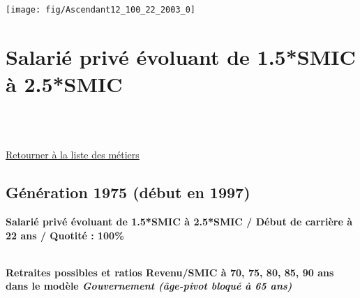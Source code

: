  \vspace{0.1cm} 

 {\hspace{-2.2cm}\texttt{[image: fig/Ascendant12\_100\_22\_2003\_0]}} 

\newpage 
 
\chapter{Salarié privé évoluant de 1.5*SMIC à 2.5*SMIC} 

~\\ 
 


   
 \localtableofcontents 

~\\ 
 
 \hyperlink{page.2}{\noindent Retourner à la liste des métiers}

 \newpage 

\section{Génération 1975 (début en 1997)\label{Ascendant1525_100_22_1975_0}} 
 
{\bf \noindent Salarié privé évoluant de 1.5*SMIC à 2.5*SMIC / Début de carrière à 22 ans / Quotité : 100\%}  ~ 

 ~\\{\bf \noindent Retraites possibles et ratios Revenu/SMIC à 70, 75, 80, 85, 90 ans dans le modèle \emph{Gouvernement (âge-pivot bloqué à 65 ans)}}  
 

